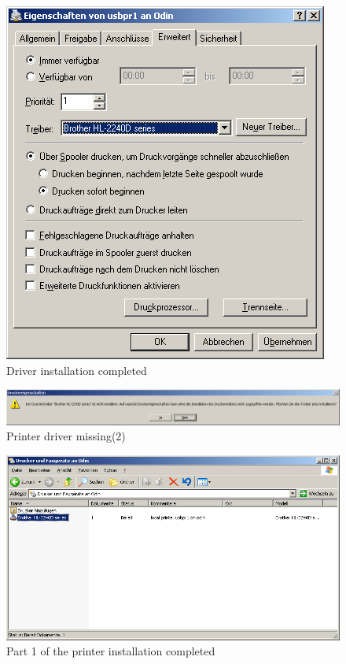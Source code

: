 \begin{figure}[hbt!]
\centering
\includegraphics[width=\columnwidth]{image015}
\caption{Driver installation completed}
\label{fig:sambalpd:setup-completed}
\end{figure}

\begin{figure}[hbt!]
\centering
\includegraphics[width=\columnwidth]{image016}
\caption{Printer driver missing(2)}
\label{fig:sambalpd:no-driver:2}
\end{figure}

\begin{figure}[hbt!]
\centering
\includegraphics[width=0.8\columnwidth]{image017}
\caption{Part 1 of the printer installation completed}
\label{fig:sambalpd:installed}
\end{figure}

